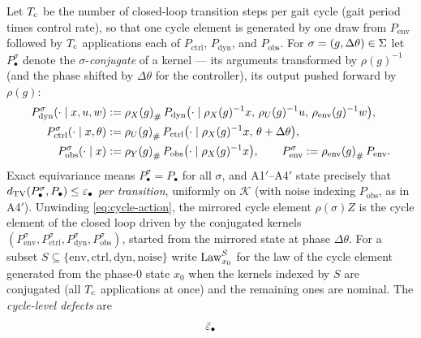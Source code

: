 \begin{definition}
\label{def:cycle-eps}
Let $T_{\mathrm{c}}$ be the number of closed-loop transition steps per gait cycle (gait
period times control rate), so that one cycle element is generated by one
draw from $P_{\mathrm{env}}$ followed by $T_{\mathrm{c}}$ applications each of
$P_{\mathrm{ctrl}}$, $P_{\mathrm{dyn}}$, and $P_{\mathrm{obs}}$. For
$\sigma = (g, \Delta\theta) \in \Sigma$ let $P^{\sigma}_{\bullet}$ denote
the $\sigma$-\emph{conjugate} of a kernel --- its arguments transformed by
$\rho(g)^{-1}$ (and the phase shifted by $\Delta\theta$ for the controller),
its output pushed forward by $\rho(g)$:
\begin{equation}
  \label{eq:conjugate}
  \begin{aligned}
    P^{\sigma}_{\mathrm{dyn}}(\cdot \mid x, u, w)
      &:= {\rho_{X}(g)}_{\#}\, P_{\mathrm{dyn}}\bigl(\cdot \mid \rho_{X}(g)^{-1}x,\,
          \rho_{U}(g)^{-1}u,\, \rho_{\mathrm{env}}(g)^{-1}w\bigr), \\
    P^{\sigma}_{\mathrm{ctrl}}(\cdot \mid x, \theta)
      &:= {\rho_{U}(g)}_{\#}\, P_{\mathrm{ctrl}}\bigl(\cdot \mid \rho_{X}(g)^{-1}x,\,
          \theta + \Delta\theta\bigr), \\
    P^{\sigma}_{\mathrm{obs}}(\cdot \mid x)
      &:= {\rho_{Y}(g)}_{\#}\, P_{\mathrm{obs}}\bigl(\cdot \mid \rho_{X}(g)^{-1}x\bigr),
    \qquad
    P^{\sigma}_{\mathrm{env}}
      := {\rho_{\mathrm{env}}(g)}_{\#}\, P_{\mathrm{env}} .
  \end{aligned}
\end{equation}
Exact equivariance means $P^{\sigma}_{\bullet} = P_{\bullet}$ for all
$\sigma$, and A1$'$--A4$'$ state precisely that
$d_{\mathrm{TV}}(P^{\sigma}_{\bullet}, P_{\bullet}) \le \varepsilon_{\mathrm{\bullet}}$ \emph{per
transition}, uniformly on $\mathcal{K}$ (with $\mathrm{noise}$ indexing
$P_{\mathrm{obs}}$, as in A4$'$). Unwinding \eqref{eq:cycle-action}, the
mirrored cycle element $\rho(\sigma) Z$ is the cycle element of the closed
loop driven by the conjugated kernels
$(P^{\sigma}_{\mathrm{env}}, P^{\sigma}_{\mathrm{ctrl}},
P^{\sigma}_{\mathrm{dyn}}, P^{\sigma}_{\mathrm{obs}})$, started from the
mirrored state at phase $\Delta\theta$. For a subset
$S \subseteq \{\mathrm{env}, \mathrm{ctrl}, \mathrm{dyn}, \mathrm{noise}\}$
write $\operatorname{Law}^{S}_{x_0}$ for the law of the cycle element generated from the
phase-$0$ state $x_0$ when the kernels indexed by $S$ are conjugated (all
$T_{\mathrm{c}}$ applications at once) and the remaining ones are nominal. The
\emph{cycle-level defects} are
\begin{equation}
  \label{eq:cycle-eps}
  \epsbar{\bullet}

\end{equation}
\end{definition}
